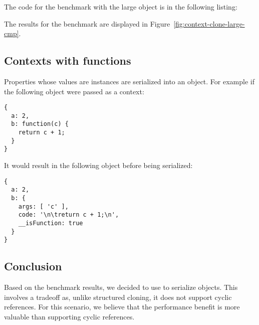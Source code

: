 The code for the benchmark with the large object is in the following listing:

The results for the benchmark are displayed in Figure~\ref{fig:context-clone-large-cmp}.

\subsection{Contexts with functions}\label{sub-sec:contexts-with-function}
Properties whose values are  instances are serialized into an object. For example if the following object were passed as a context:
\begin{lstlisting}[caption=Example context with a function property]
{
  a: 2,
  b: function(c) {
    return c + 1;
  }
}
\end{lstlisting}

It would result in the following object before being serialized:
\begin{lstlisting}[caption=Example processed context]
{
  a: 2,
  b: {
    args: [ 'c' ],
    code: '\n\treturn c + 1;\n',
    __isFunction: true
  }
}
\end{lstlisting}

\subsection{Conclusion}
Based on the benchmark results, we decided to use  to serialize  objects. This involves a tradeoff as, unlike structured cloning, it does not support cyclic references. For this scenario, we believe that the performance benefit is more valuable than supporting cyclic references.

\pagebreak